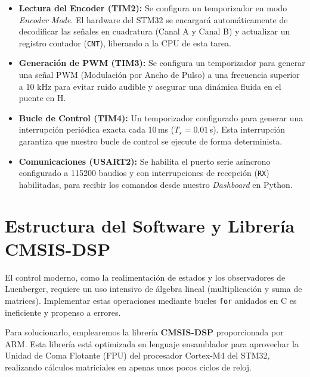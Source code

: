 \documentclass[10pt,a4paper]{report}
\begin{document}
\begin{itemize}
	\item \textbf{Lectura del Encoder (TIM2):} Se configura un temporizador en modo \textit{Encoder Mode}. El hardware del STM32 se encargará automáticamente de decodificar las señales en cuadratura (Canal A y Canal B) y actualizar un registro contador (\texttt{CNT}), liberando a la CPU de esta tarea.
	\item \textbf{Generación de PWM (TIM3):} Se configura un temporizador para generar una señal PWM (Modulación por Ancho de Pulso) a una frecuencia superior a 10 kHz para evitar ruido audible y asegurar una dinámica fluida en el puente en H.
	\item \textbf{Bucle de Control (TIM4):} Un temporizador configurado para generar una interrupción periódica exacta cada 10\,ms ($T_s = 0.01\,$s). Esta interrupción garantiza que nuestro bucle de control se ejecute de forma determinista.
	\item \textbf{Comunicaciones (USART2):} Se habilita el puerto serie asíncrono configurado a 115200 baudios y con interrupciones de recepción (\texttt{RX}) habilitadas, para recibir los comandos desde nuestro \textit{Dashboard} en Python.
\end{itemize}


\section{Estructura del Software y Librería CMSIS-DSP}
El control moderno, como la realimentación de estados y los observadores de Luenberger, requiere un uso intensivo de álgebra lineal (multiplicación y suma de matrices). Implementar estas operaciones mediante bucles \texttt{for} anidados en C es ineficiente y propenso a errores.

Para solucionarlo, emplearemos la librería \textbf{CMSIS-DSP} proporcionada por ARM. Esta librería está optimizada en lenguaje ensamblador para aprovechar la Unidad de Coma Flotante (FPU) del procesador Cortex-M4 del STM32, realizando cálculos matriciales en apenas unos pocos ciclos de reloj.
\end{document}
